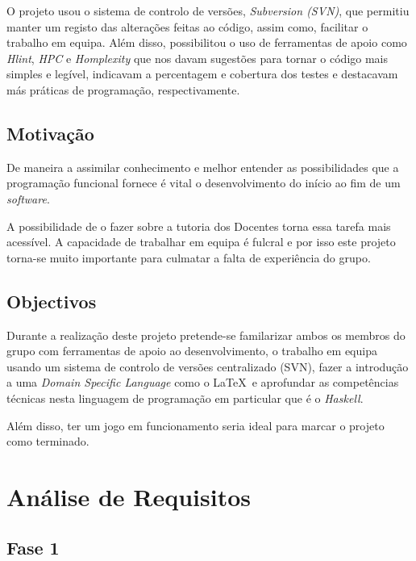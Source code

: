 \documentclass[a4paper]{report}
\begin{document}
  O projeto usou o sistema de controlo de versões, \emph{Subversion (SVN)}, que
  permitiu manter um registo das alterações feitas ao código, assim como,
  facilitar o trabalho em equipa. Além disso, possibilitou o uso de ferramentas
  de apoio como \emph{Hlint}, \emph{HPC} e \emph{Homplexity} que nos davam
  sugestões para tornar o código mais simples e legível, indicavam a percentagem
  e cobertura dos testes e destacavam más práticas de programação,
  respectivamente.

  \section{Motivação}
  De maneira a assimilar conhecimento e melhor entender as possibilidades que a
  programação funcional fornece é vital o desenvolvimento do início ao fim de um
  \emph{software}.

  A possibilidade de o fazer sobre a tutoria dos Docentes torna essa tarefa mais
  acessível. A capacidade de trabalhar em equipa é fulcral e por isso este
  projeto torna-se muito importante para culmatar a falta de experiência do
  grupo.

  \section{Objectivos}
  Durante a realização deste projeto pretende-se familarizar ambos os membros do
  grupo com ferramentas de apoio ao desenvolvimento, o trabalho em equipa usando
  um sistema de controlo de versões centralizado (SVN), fazer a introdução a uma
  \emph{Domain Specific Language} como o \LaTeX \ e aprofundar as competências
  técnicas nesta linguagem de programação em particular que é o \emph{Haskell}.

  Além disso, ter um jogo em funcionamento seria ideal para marcar o projeto
  como terminado.

\chapter{Análise de Requisitos}


\section{Fase 1}
\label{sec:analisefase1}
\end{document}
